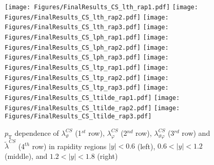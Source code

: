 \documentclass[12pt]{article}
\newcommand{\pT}{p_\mathrm{T}}
\newcommand{\absy}{\left |  y \right |}
\newcommand{\lamthCS}{\lambda^{\scriptscriptstyle CS}_\vartheta}
\newcommand{\lamphCS}{\lambda^{\scriptscriptstyle CS}_\varphi}
\newcommand{\lamthphCS}{\lambda^{\scriptscriptstyle CS}_{\vartheta \varphi}}
\newcommand{\lamtildeCS}{\tilde{\lambda}^{\scriptscriptstyle CS}}
\begin{document}



\begin{figure}[htbp]
\centering
\texttt{[image: Figures/FinalResults\_CS\_lth\_rap1.pdf]}
\texttt{[image: Figures/FinalResults\_CS\_lth\_rap2.pdf]}
\texttt{[image: Figures/FinalResults\_CS\_lth\_rap3.pdf]}
\texttt{[image: Figures/FinalResults\_CS\_lph\_rap1.pdf]}
\texttt{[image: Figures/FinalResults\_CS\_lph\_rap2.pdf]}
\texttt{[image: Figures/FinalResults\_CS\_lph\_rap3.pdf]}
\texttt{[image: Figures/FinalResults\_CS\_ltp\_rap1.pdf]}
\texttt{[image: Figures/FinalResults\_CS\_ltp\_rap2.pdf]}
\texttt{[image: Figures/FinalResults\_CS\_ltp\_rap3.pdf]}
\texttt{[image: Figures/FinalResults\_CS\_ltilde\_rap1.pdf]}
\texttt{[image: Figures/FinalResults\_CS\_ltilde\_rap2.pdf]}
\texttt{[image: Figures/FinalResults\_CS\_ltilde\_rap3.pdf]}
\caption{$\pT$ dependence of $\lamthCS$
(1$^{st}$ row), $\lamphCS$ (2$^{nd}$ row), $\lamthphCS$ (3$^{rd}$ row) and 
$\lamtildeCS$ (4$^{th}$ row) in rapidity regions $\absy<0.6$ (left), 
$0.6<\absy<1.2$ (middle), and $1.2<\absy<1.8$ (right)}
\end{figure}
\clearpage
\end{document}
